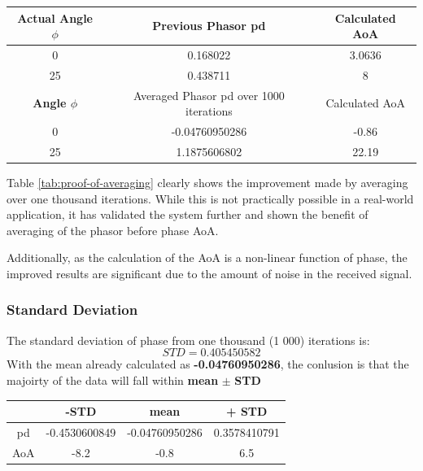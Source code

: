 \documentclass[class=report,11pt,crop=false]{standalone}
\begin{document}
\begin{center}
    \begin{tabular}{c|c|c}
        \textbf{Actual Angle $\phi$} & Previous Phasor \gls{pd} & Calculated \gls{AoA}\\
        \hline
        0 & 0.168022 & 3.0636\\
        \vspace{0.5cm}
        25 & 0.438711 & 8\\
        \textbf{Angle $\phi$} & Averaged Phasor \gls{pd} over 1000 iterations & Calculated \gls{AoA}\\
        \hline
        0 & -0.04760950286 & -0.86\\ 
        25 & 1.1875606802 & 22.19 \\
    \end{tabular}
\end{center}

Table \ref{tab:proof-of-averaging} clearly shows the improvement made by averaging over one thousand iterations. While this is not practically possible in a real-world application, it has validated the system further and shown the benefit of averaging of the phasor before phase \gls{AoA}.

Additionally, as the calculation of the \gls{AoA} is a non-linear function of phase, the improved results are significant due to the amount of noise in the received signal. 

\subsubsection{Standard Deviation}

The standard deviation of phase from one thousand (1 000) iterations is:
\begin{equation*}
    STD = 0.405450582
\end{equation*}
With the mean already calculated as \textbf{-0.04760950286}, the conlusion is that the majoirty of the data will fall within \textbf{mean} $\pm$ \textbf{STD}

\begin{center}
    \begin{tabular}{c|c|c|c}
        & -STD & mean & + STD  \\
        \hline
        \gls{pd} & -0.4530600849 & -0.04760950286 & 0.3578410791 \\
        \gls{AoA} & -8.2 & -0.8 & 6.5\\
    \end{tabular}
\end{center}
\end{document}
